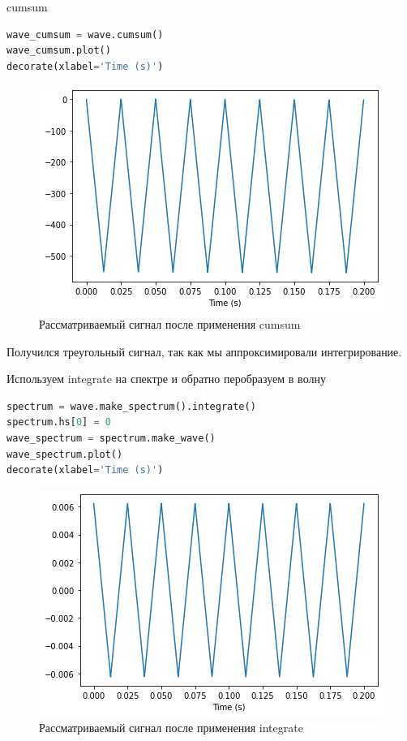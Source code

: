 cumsum

\begin{lstlisting}[language=Python]
wave_cumsum = wave.cumsum()
wave_cumsum.plot()
decorate(xlabel='Time (s)')
\end{lstlisting}

\begin{figure}[H]
	\begin{center}
		\includegraphics[scale=1]{fig/lab09/lab09_05.png}
		\caption{Рассматриваемый сигнал после применения cumsum}
	\end{center}
\end{figure}

Получился треугольный сигнал, так как мы аппроксимировали интегрирование.

Используем integrate на спектре и обратно перобразуем в волну

\begin{lstlisting}[language=Python]
spectrum = wave.make_spectrum().integrate()
spectrum.hs[0] = 0
wave_spectrum = spectrum.make_wave()
wave_spectrum.plot()
decorate(xlabel='Time (s)')
\end{lstlisting}

\begin{figure}[H]
	\begin{center}
		\includegraphics[scale=1]{fig/lab09/lab09_06.png}
		\caption{Рассматриваемый сигнал после применения integrate}
	\end{center}
\end{figure}


